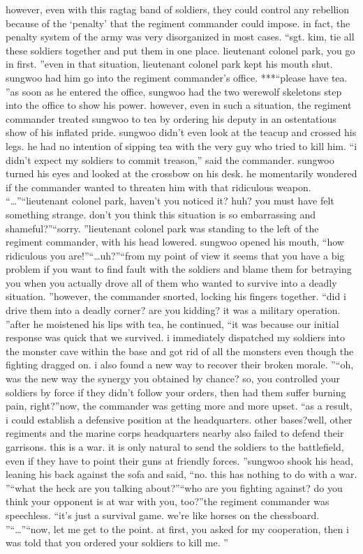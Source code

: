 however, even with this ragtag band of soldiers, they could control any rebellion because of the ‘penalty’ that the regiment commander could impose.
 in fact, the penalty system of the army was very disorganized in most cases.
“sgt.
 kim, tie all these soldiers together and put them in one place.
 lieutenant colonel park, you go in first.
”even in that situation, lieutenant colonel park kept his mouth shut.
sungwoo had him go into the regiment commander’s office.
***“please have tea.
”as soon as he entered the office, sungwoo had the two werewolf skeletons step into the office to show his power.
however, even in such a situation, the regiment commander treated sungwoo to tea by ordering his deputy in an ostentatious show of his inflated pride.
sungwoo didn’t even look at the teacup and crossed his legs.
 he had no intention of sipping tea with the very guy who tried to kill him.
“i didn’t expect my soldiers to commit treason,” said the commander.
sungwoo turned his eyes and looked at the crossbow on his desk.
 he momentarily wondered if the commander wanted to threaten him with that ridiculous weapon.
“…”“lieutenant colonel park, haven’t you noticed it? huh? you must have felt something strange.
 don’t you think this situation is so embarrassing and shameful?”“sorry.
”lieutenant colonel park was standing to the left of the regiment commander, with his head lowered.
sungwoo opened his mouth, “how ridiculous you are!”“…uh?”“from my point of view it seems that you have a big problem if you want to find fault with the soldiers and blame them for betraying you when you actually drove all of them who wanted to survive into a deadly situation.
”however, the commander snorted, locking his fingers together.
“did i drive them into a deadly corner? are you kidding? it was a military operation.
”after he moistened his lips with tea, he continued, “it was because our initial response was quick that we survived.
 i immediately dispatched my soldiers into the monster cave within the base and got rid of all the monsters even though the fighting dragged on.
 i also found a new way to recover their broken morale.
”“oh, was the new way the synergy you obtained by chance? so, you controlled your soldiers by force if they didn’t follow your orders, then had them suffer burning pain, right?”now, the commander was getting more and more upset.
“as a result, i could establish a defensive position at the headquarters.
 other bases?well, other regiments and the marine corps headquarters nearby also failed to defend their garrisons.
 this is a war.
 it is only natural to send the soldiers to the battlefield, even if they have to point their guns at friendly forces.
”sungwoo shook his head, leaning his back against the sofa and said, “no.
 this has nothing to do with a war.
”“what the heck are you talking about?”“who are you fighting against? do you think your opponent is at war with you, too?”the regiment commander was speechless.
“it’s just a survival game.
 we’re like horses on the chessboard.
”“…”“now, let me get to the point.
 at first, you asked for my cooperation, then i was told that you ordered your soldiers to kill me.
”


